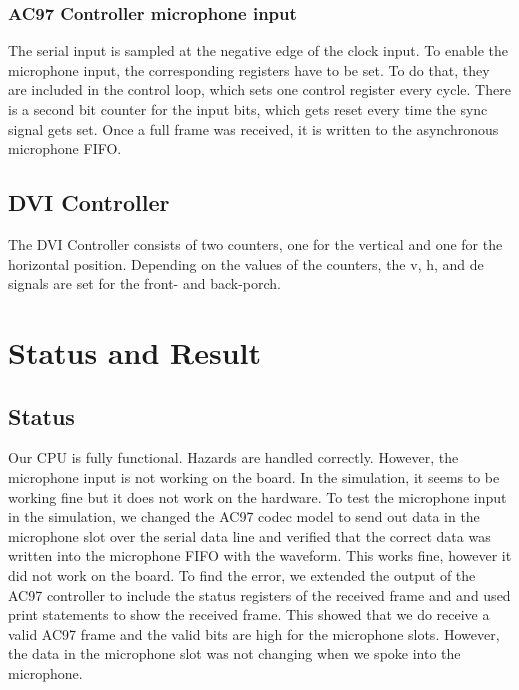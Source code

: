 \documentclass[12pt]{article}
\begin{document}
\subsubsection{AC97 Controller microphone input}
The serial input is sampled at the negative edge of the clock input. To enable the microphone input, the corresponding registers have to be set. To do that, they are included in the control loop, which sets one control register every cycle. There is a second bit counter for the input bits, which gets reset every time the sync signal gets set. Once a full frame was received, it is written to the asynchronous microphone FIFO.

\subsection{DVI Controller}
The DVI Controller consists of two counters, one for the vertical and one for the horizontal position. Depending on the values of the counters, the v, h, and de signals are set for the front- and back-porch.


\section{Status and Result}
\subsection{Status}
Our CPU is fully functional. Hazards are handled correctly. However, the microphone input is not working on the board. In the simulation, it seems to be working fine but it does not work on the hardware. To test the microphone input in the simulation, we changed the AC97 codec model to send out data in the microphone slot over the serial data line and verified that the correct data was written into the microphone FIFO with the waveform. This works fine, however it did not work on the board. To find the error, we extended the output of the AC97 controller to include the status registers of the received frame and and used print statements to show the received frame. This showed that we do receive a valid AC97 frame and the valid bits are high for the microphone slots. However, the data in the microphone slot was not changing when we spoke into the microphone.
\end{document}
